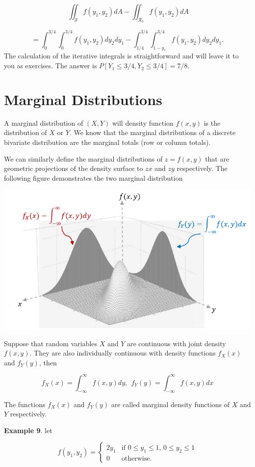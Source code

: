 \documentclass[
]{book}
\begin{document}
\[
\ \iint_{\mathcal{S}} f(y_1,y_2)dA - \iint_{\mathcal{R_0}} f(y_1,y_2)dA
\]

\[
=\int_0^{3/4}\int_0^{3/4} f(y_1, y_2)  dy_2dy_1 - \int_{1/4}^{3/4}\int_{1-y_1}^{3/4} f(y_1,y_2) dy_2dy_1.
\]
The calculation of the iterative integrals is straightforward and will leave it to you as exercises. The answer is \(P[Y_1 \le 3/4, Y_2 \le 3/4] = 7/8\).

\hypertarget{marginal-distributions-1}{%
\section{Marginal Distributions}\label{marginal-distributions-1}}

A marginal distribution of \((X,Y)\) will density function \(f(x,y)\) is the distribution of \(X\) or \(Y\). We know that the marginal distributions of a discrete bivariate distribution are the marginal totals (row or column totals).

We can similarly define the marginal distributions of \(z = f(x,y)\) that are geometric projections of the density surface to \(zx\) and \(zy\) respectively. The following figure demonstrates the two marginal distribution

\begin{center}\includegraphics[width=0.6\linewidth]{topic06/bivariateMarginalDistribution} \end{center}

Suppose that random variables \(X\) and \(Y\) are continuous with joint density \(f(x,y)\). They are also individually continuous with density functions \(f_X(x)\) and \(f_Y(y)\), then

\[
f_X(x) = \int_{-\infty}^\infty f(x,y) dy, \ \  f_Y(y) = \int_{-\infty}^\infty f(x,y)dx 
\]

The functions \(f_X(x)\) and \(f_Y(y)\) are called marginal density functions of \(X\) and \(Y\) respectively.

\hfill\break

\textbf{Example 9}. let

\[
\displaystyle f(y_1, y_2) = \begin{cases} 
 2y_1 & \text{if $0 \le y_1 \le 1$, $0 \le y_2 \le 1$}\\  
 0 & \text{otherwise}.
 \end{cases}
\]
\end{document}
